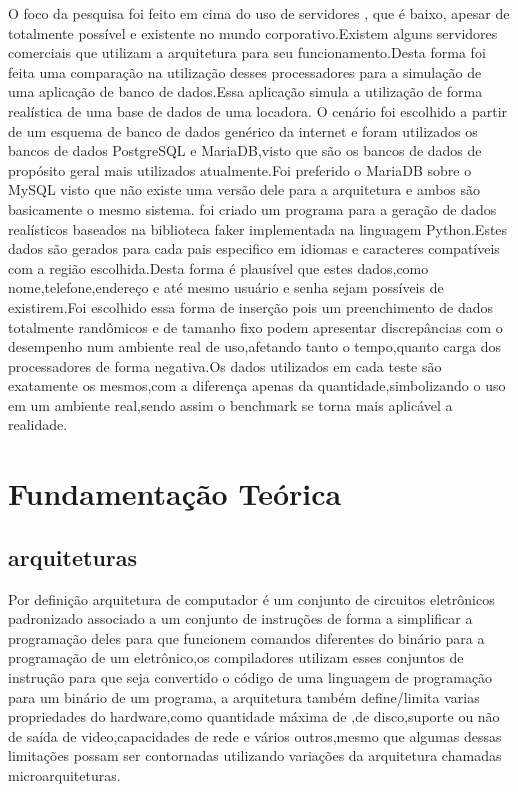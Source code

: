\documentclass[
	12pt,				%
	openright,			%
	oneside,			%
	a4paper,			%
	english,			%
	french,				%
	spanish,			%
	brazil,				%
	]{abntex2}
\begin{document}
O foco da pesquisa foi feito em cima do uso de servidores , que é baixo, apesar de totalmente possível e existente no mundo corporativo.Existem alguns servidores comerciais que utilizam a arquitetura  para seu funcionamento.Desta forma foi feita uma comparação na utilização desses processadores para a simulação de uma aplicação de banco de dados.Essa aplicação simula a utilização de forma realística de uma base de dados de uma locadora. \newline
O cenário foi escolhido a partir de um esquema de banco de dados genérico da internet e foram utilizados os bancos de dados PostgreSQL e MariaDB,visto que são os bancos de dados de propósito geral mais utilizados atualmente.Foi preferido o MariaDB sobre o MySQL visto que não existe uma versão dele para a arquitetura  e ambos são basicamente o mesmo sistema.\newline
foi criado um programa para a geração de dados realísticos baseados na biblioteca faker implementada na linguagem Python.Estes dados são gerados para cada pais especifico em idiomas e caracteres compatíveis com a região escolhida.Desta forma é plausível que estes dados,como nome,telefone,endereço e até mesmo usuário e senha sejam possíveis de existirem.Foi escolhido essa forma de inserção pois um preenchimento de dados totalmente randômicos e de tamanho fixo podem apresentar discrepâncias com o desempenho num ambiente real de uso,afetando tanto o tempo,quanto carga dos processadores de forma negativa.Os dados utilizados em cada teste são exatamente os mesmos,com a diferença apenas da quantidade,simbolizando o uso em um ambiente real,sendo assim o benchmark se torna mais aplicável a realidade.\newline

\chapter{Fundamentação Teórica}
\label{ch:fundamentacao teorica}

\section{arquiteturas}
\label{sec: arquiteturas}
Por definição arquitetura de computador é um conjunto de circuitos eletrônicos padronizado associado a um conjunto de instruções de forma a simplificar a programação deles para que funcionem comandos diferentes do binário para a programação de um eletrônico,os compiladores utilizam esses conjuntos de instrução para que seja convertido o código de uma linguagem de programação para um binário de um programa, a arquitetura também define/limita varias propriedades do hardware,como quantidade máxima de ,de disco,suporte ou não de saída de video,capacidades de rede e vários outros,mesmo que algumas dessas limitações possam ser contornadas utilizando variações da arquitetura chamadas microarquiteturas.\newline
\end{document}
